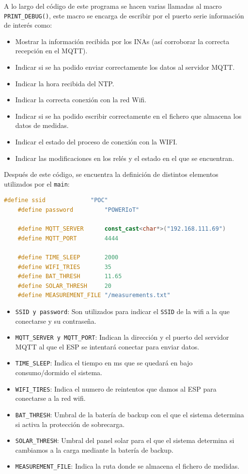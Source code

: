 A lo largo del código de este programa se hacen varias llamadas al macro \texttt{PRINT\_DEBUG()}, este macro se encarga de escribir por el puerto serie información de interés como:
\begin{itemize}
    \item Mostrar la información recibida por los INAs (así corroborar la correcta recepción en el MQTT).
    \item Indicar si se ha podido enviar correctamente los datos al servidor MQTT.
    \item Indicar la hora recibida del NTP.
    \item Indicar la correcta conexión con la red Wifi.
    \item Indicar si se ha podido escribir correctamente en el fichero que almacena los datos de medidas.
    \item Indicar el estado del proceso de conexión con la WIFI.
    \item Indicar las modificaciones en los relés y el estado en el que se encuentran.
\end{itemize}

Después de este código, se encuentra la definición de distintos elementos utilizados por el \texttt{main}:
\begin{lstlisting}[captionpos=b, caption={DEFINES de MAIN\_POWER}, language=c++]
    #define ssid             "POC"
    #define password         "POWERIoT"
    
    #define MQTT_SERVER      const_cast<char*>("192.168.111.69")
    #define MQTT_PORT        4444
    
    #define TIME_SLEEP       2000
    #define WIFI_TRIES       35
    #define BAT_THRESH       11.65
    #define SOLAR_THRESH     20
    #define MEASUREMENT_FILE "/measurements.txt"
\end{lstlisting}

\begin{itemize}
    \item \texttt{SSID y password}: Son utilizados para indicar el \texttt{SSID} de la wifi a la que conectarse y su contraseña. 
    \item \texttt{MQTT\_SERVER y MQTT\_PORT}: Indican la dirección y el puerto del servidor MQTT al que el ESP se intentará conectar para enviar datos.
    \item \texttt{TIME\_SLEEP}: Indica el tiempo en ms que se quedará en bajo consumo/dormido el sistema.
    \item \texttt{WIFI\_TIRES}: Indica el numero de reintentos que damos al ESP para conectarse a la red wifi.
    \item \texttt{BAT\_THRESH}: Umbral de la batería de backup con el que el sistema determina si activa la protección de sobrecarga.
    \item \texttt{SOLAR\_THRESH}: Umbral del panel solar para el que el sistema determina si cambiamos a la carga mediante la batería de backup.
    \item \texttt{MEASUREMENT\_FILE}: Indica la ruta donde se almacena el fichero de medidas.
\end{itemize}

